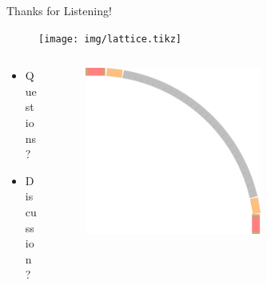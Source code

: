 \documentclass{beamer}
\begin{document}
\begin{frame}[t,fragile]{Thanks for Listening!}
\begin{figure}
\centering
\texttt{[image: img/lattice.tikz]}
\end{figure}
\begin{columns}
\begin{column}{0.6\textwidth}
\begin{itemize}
\item Questions?
\item Discussion?
\end{itemize}
\end{column}
\begin{column}{0.4\textwidth}  %
    \begin{figure}
       \centering
       \includegraphics[width=0.6\textwidth]{img/quarterring.pdf}
       \end{figure}
\end{column}
\end{columns}
\end{frame}
\end{document}
